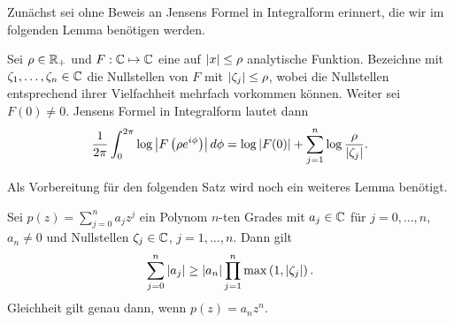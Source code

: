 Zunächst sei ohne Beweis an Jensens Formel in Integralform erinnert, die wir im
folgenden Lemma benötigen werden.
\begin{theorem}
    \label{thm:jensens_formula}
    Sei $\rho \in \mathbb{R}_+$ und $F: \mathbb{C} \mapsto \mathbb{C}$ eine auf $\left\lvert x \right\rvert \leq \rho$
    analytische Funktion.
    Bezeichne mit $\zeta_1, \dots, \zeta_n \in \mathbb{C}$ die Nullstellen von $F$ mit
    $\left\lvert \zeta_j \right\rvert \leq \rho$, wobei die Nullstellen entsprechend ihrer
    Vielfachheit mehrfach vorkommen können.
    Weiter sei $F(0) \neq 0$.
    Jensens Formel in Integralform lautet dann
    \begin{equation}
        \frac{1}{2\pi} \int_{0}^{2 \pi} \log \left\lvert F\left( \rho e^{i\phi} \right) \right\rvert d\phi
        = \log \left\lvert F(0) \right\rvert + \sum_{j=1}^{n} \log \frac{\rho}{\left\lvert \zeta_j \right\rvert}.
    \end{equation}
\end{theorem}

Als Vorbereitung für den folgenden Satz wird noch ein weiteres Lemma benötigt.
\begin{lemma}
    \label{lemma:polynom_coefficient_sum_inequality}
    Sei $p(z) = \sum_{j = 0}^{n} a_j z^j$ ein Polynom $n$-ten Grades mit
    $a_j \in \mathbb{C}$ für $j = 0, \dots, n$, $a_n \neq 0$ und Nullstellen
    $\zeta_j \in \mathbb{C}$, $j = 1, \dots, n$.
    Dann gilt
    \begin{equation}
        \label{eq:polynom_coefficient_sum_inequality}
        \sum_{j=0}^{n} \left\lvert a_j \right\rvert \geq \left\lvert a_n \right\rvert \prod_{j=1}^{n} \max \left(1, \left\lvert \zeta_j \right\rvert \right).
    \end{equation}
    Gleichheit gilt genau dann, wenn $p(z) = a_n z^n$.
\end{lemma}

